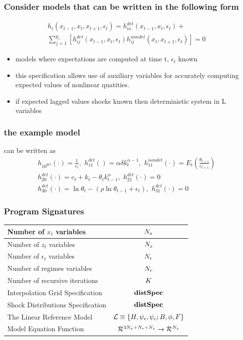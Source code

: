 \documentclass[tikz]{beamer}
\begin{document}
\begin{frame}
\frametitle{Consider  models that can be written in  the following form}


\begin{gather}
  h_i(x_{t-1},x_{t},x_{t+1},\epsilon_t)=h^{det}_{io}(x_{t-1},x_{t},\epsilon_t)+\\ \sum_{j=1}^{p_i} [h^{det}_{ij}(x_{t-1},x_{t},\epsilon_t)h^{nondet}_{ij}(x_{t},x_{t+1},\epsilon_t)]=0
\end{gather}

\begin{itemize}
\item models where expectations are computed at time t, $\epsilon_t$  known
\item this specification allows use of auxiliary variables for 
accurately computing expected values of nonlinear quatities.
\item if expected lagged values shocks known then deterministic system in L variables
\end{itemize}

\end{frame}


\begin{frame}
\frametitle{the example  model }
\label{sec:simple-rbc-model-ext} can be written as
\begin{gather}
h_{10^{det}}(\cdot)=\frac{1}{c_t},\,\,
h_{11}^{det}()=\alpha \delta k_{t}^{\alpha-1} ,\,\,
h_{11}^{nondet}(\cdot)=E_t \left (\frac{\theta_{t+1}}{c_{t+1}} \right )\\
h_{20}^{det}(\cdot)=c_t + k_t-\theta_tk_{t-1}^\alpha,\,\,
h_{21}^{det}(\cdot)=0\\
h_{30}^{det}(\cdot)=\ln \theta_t -(\rho \ln \theta_{t-1} + \epsilon_t),\,\,
h_{31}^{det}(\cdot)=0
\end{gather}

\end{frame}



\begin{frame}
\frametitle{Program Signatures}
\label{sec:program-listings}
\begin{tabular}{|l|c|}
\hline
Number of $x_t$ variables&${N_x}$\\
\hline
Number of $z_t$ variables&${N_z}$\\
\hline
Number of $\epsilon_t$ variables&${N_\epsilon}$\\
\hline
Number of regimes variables&${N_r}$\\
\hline
Number of recursive iterations&${K}$\\
\hline
Interpolation Grid Specification&${\mathbf{distSpec}}$\\
\hline
Shock Distributions  Specification&${\mathbf{distSpec}}$\\
\hline
The Linear Reference Model&${\mathcal{L}}\equiv{\{H,\psi_\epsilon,\psi_c;B,\phi,F\}}$\\  
\hline
Model Equation Function&${{\mathcal{R}^{3{N_x}+{N_\epsilon}+{N_z}}}\rightarrow{\mathcal{R}^{{N_x}}}}$\\
\hline
\end{tabular}

\end{frame}
\end{document}
